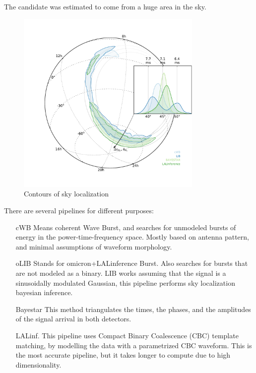 \documentclass[10pt]{beamer}
\begin{document}
\begin{frame}
The candidate was estimated to come from a huge area in the sky.
\begin{figure}
 \centering
 \includegraphics[width=0.8\textwidth]{./slides/plots/160208492v4/contours.pdf}
 
 \caption{Contours of sky localization}
 \label{fig:contours}
\end{figure}
\end{frame}
\begin{frame}
There are several pipelines for different purposes:

\begin{itemize}%
 \item[cWB] Means coherent Wave Burst, and searches for unmodeled bursts
 of energy in the power-time-frequency space. Mostly based on antenna pattern, 
 and minimal assumptions of waveform morphology.
 
 \item[oLIB] Stands for omicron+LALinference Burst. Also searches for 
 bursts that are not modeled as a binary. LIB works assuming that the 
 signal is a sinusoidally modulated Gaussian, this pipeline performs 
 sky localization bayesian inference.
 
 \item[Bayestar] This method triangulates the times, the phases, and the 
 amplitudes of the signal arrival in both detectors.
 
 \item[LALinf.] This pipeline uses Compact Binary Coalescence (CBC) 
 template matching, by modelling the data with a parametrized CBC waveform.
 This is the most accurate pipeline, but it takes longer to compute
 due to high dimensionality.
\end{itemize}

\end{frame}
\end{document}

